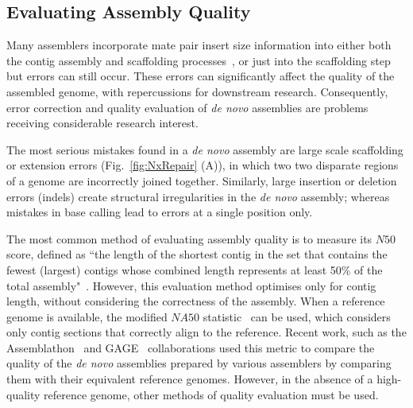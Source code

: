 \subsection{Evaluating Assembly Quality}
Many assemblers incorporate mate pair insert size information into either both the contig assembly and scaffolding processes~\cite{medvedev2011, Bankevich2012}, or just into the scaffolding step~\cite{Zerbino2008} but errors can still occur. These errors can significantly affect the quality of the assembled genome, with repercussions for downstream research. Consequently, error correction and quality evaluation of \textit{de novo} assemblies are problems receiving considerable research interest.

The most serious mistakes found in a \textit{de novo} assembly are large scale scaffolding or extension errors (Fig.~\ref{fig:NxRepair} (A)), in which two two disparate regions of a genome are incorrectly joined together. Similarly, large insertion or deletion errors (indels) create structural irregularities in the \textit{de novo} assembly; whereas mistakes in base calling lead to errors at a single position only. 

The most common method of evaluating assembly quality is to measure its $N50$ score, defined as ``the length of the shortest contig in the set that contains the fewest (largest) contigs whose combined length represents at least 50\% of the total assembly"~\cite{Miller2010}. However, this evaluation method optimises only for contig length, without considering the correctness of the assembly. When a reference genome is available, the modified $NA50$ statistic~\cite{Gurevich2013} can be used, which considers only contig sections that correctly align to the reference. Recent work, such as the Assemblathon~\cite{Bradnam2013} and GAGE~\cite{Salzberg2012} collaborations used this metric to compare the quality of the \textit{de novo} assemblies prepared by various assemblers by comparing them with their equivalent reference genomes. However, in the absence of a high-quality reference genome, other methods of quality evaluation must be used.

